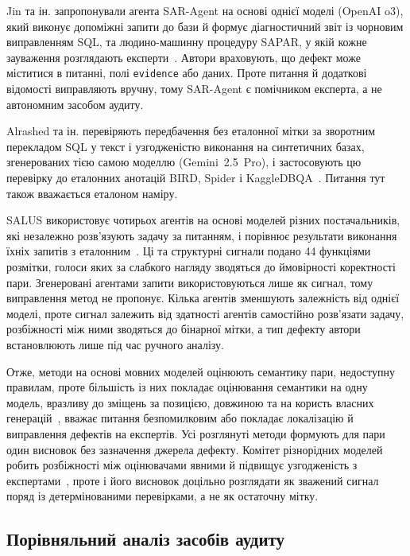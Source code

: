\documentclass[a4paper,14pt,oneside]{extreport}
\begin{document}
Jin та ін. запропонували агента SAR-Agent на основі однієї моделі (OpenAI o3), який виконує допоміжні запити до бази й формує діагностичний звіт із чорновим виправленням SQL, та людино-машинну процедуру SAPAR, у якій кожне зауваження розглядають експерти~\cite{jin2026annotation}. Автори враховують, що дефект може міститися в питанні, полі \texttt{evidence} або даних. Проте питання й додаткові відомості виправляють вручну, тому SAR-Agent є помічником експерта, а не автономним засобом аудиту.

Alrashed та ін. перевіряють передбачення без еталонної мітки за зворотним перекладом SQL у текст і узгодженістю виконання на синтетичних базах, згенерованих тією самою моделлю (Gemini~2.5~Pro), і застосовують цю перевірку до еталонних анотацій BIRD, Spider і KaggleDBQA~\cite{alrashed2026verification}. Питання тут також вважається еталоном наміру.

SALUS використовує чотирьох агентів на основі моделей різних постачальників, які незалежно розв'язують задачу за питанням, і порівнює результати виконання їхніх запитів з еталонним~\cite{zhou2026salus}. Ці та структурні сигнали подано 44 функціями розмітки, голоси яких за слабкого нагляду зводяться до ймовірності коректності пари. Згенеровані агентами запити використовуються лише як сигнал, тому виправлення метод не пропонує. Кілька агентів зменшують залежність від однієї моделі, проте сигнал залежить від здатності агентів самостійно розв'язати задачу, розбіжності між ними зводяться до бінарної мітки, а тип дефекту автори встановлюють лише під час ручного аналізу.

Отже, методи на основі мовних моделей оцінюють семантику пари, недоступну правилам, проте більшість із них покладає оцінювання семантики на одну модель, вразливу до зміщень за позицією, довжиною та на користь власних генерацій~\cite{zheng2023judgingllm}, вважає питання безпомилковим або покладає локалізацію й виправлення дефектів на експертів. Усі розглянуті методи формують для пари один висновок без зазначення джерела дефекту. Комітет різнорідних моделей робить розбіжності між оцінювачами явними й підвищує узгодженість з експертами~\cite{chan2024chateval}, проте і його висновок доцільно розглядати як зважений сигнал поряд із детермінованими перевірками, а не як остаточну мітку.

\subsection{Порівняльний аналіз засобів аудиту}
\label{subsec:audit-comparison}
\end{document}

